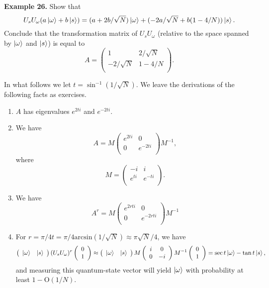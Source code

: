 \documentclass [12pt]{article}
\theoremstyle{definition}
\begin{document}
\textbf{Example 26.} Show that 
\[U_sU_{\omega}(a\ket{\omega}+b\ket{s}) = (a+2b/\sqrt{N})\ket{\omega} + (-2a/\sqrt{N} + b(1-4/N))\ket{s}.\]
Conclude that the transformation matrix of $U_sU_{\omega}$ (relative to the space spanned by $\ket{\omega}$ and $\ket{s}$) is equal to
\[A = 
\left(\begin{array}{cc}
1 & 2/\sqrt{N}\\
-2/\sqrt{N} & 1-4/N\\
\end{array}\right).\]


\newpage
In what follows we let $t = \sin^{-1}(1/\sqrt{N})$. 
We leave the derivations of the following facts as exercises.

\begin{enumerate}
\item $A$ has eigenvalues $e^{2ti}$ and $e^{-2ti}$.
\item We have
\[A = M
\left(\begin{array}{cc}
e^{2ti} & 0\\
0 & e^{-2ti}\\
\end{array}\right)
M^{-1},\]
where 
\[M=\left(\begin{array}{cc}
-i & i\\
e^{ti} & e^{-ti}\\
\end{array}\right).\]

\item We have
\[A^r = M
\left(\begin{array}{cc}
e^{2rti} & 0\\
0 & e^{-2rti}\\
\end{array}\right)
M^{-1}\]
\item For $r=\pi/4t = \pi/4\mbox{arcsin}(1/\sqrt{N})\approx \pi\sqrt{N}/4$, we have
\[\left(\begin{array}{cc}
\ket{\omega} & \ket{s}\\
\end{array}\right)
(U_sU_{\omega})^r
\left(\begin{array}{c}
0\\
1\\
\end{array}\right) \approx
\left(\begin{array}{cc}
\ket{\omega} & \ket{s}\\
\end{array}\right)
M
\left(\begin{array}{cc}
i & 0\\
0 & -i\\
\end{array}\right)
M^{-1}
\left(\begin{array}{c}
0\\
1\\
\end{array}\right) = \sec{t}\ket{\omega} -\tan{t}\ket{s},\]
and measuring this quantum-state vector will yield $\ket{\omega}$ with probability at least 
$1-\mbox{O}(1/N)$.


\end{enumerate}
\end{document}
